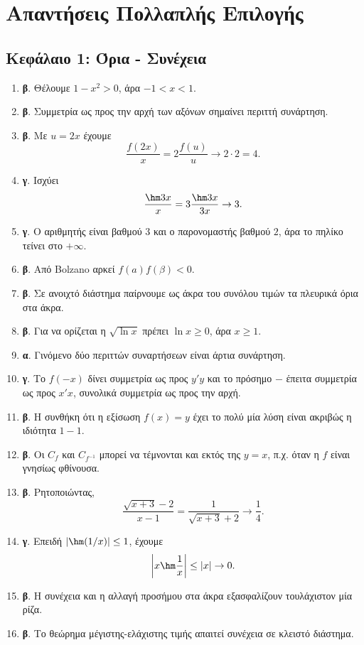 \section*{Απαντήσεις Πολλαπλής Επιλογής}

\subsection*{Κεφάλαιο 1: Όρια - Συνέχεια}
\begin{enumerate}[label=\textbf{1.\arabic*.}]
\item \textbf{β}. Θέλουμε $1-x^2>0$, άρα $-1<x<1$.
\item \textbf{β}. Συμμετρία ως προς την αρχή των αξόνων σημαίνει περιττή συνάρτηση.
\item \textbf{β}. Με $u=2x$ έχουμε
\[
\frac{f(2x)}{x}=2\frac{f(u)}{u}\to 2\cdot2=4.
\]
\item \textbf{γ}. Ισχύει
\[
\frac{\hm 3x}{x}=3\frac{\hm 3x}{3x}\to3.
\]
\item \textbf{γ}. Ο αριθμητής είναι βαθμού $3$ και ο παρονομαστής βαθμού $2$, άρα το πηλίκο τείνει στο $+\infty$.
\item \textbf{β}. Από Bolzano αρκεί $f(a)f(\beta)<0$.
\item \textbf{β}. Σε ανοιχτό διάστημα παίρνουμε ως άκρα του συνόλου τιμών τα πλευρικά όρια στα άκρα.
\item \textbf{β}. Για να ορίζεται η $\sqrt{\ln x}$ πρέπει $\ln x\geq0$, άρα $x\geq1$.
\item \textbf{α}. Γινόμενο δύο περιττών συναρτήσεων είναι άρτια συνάρτηση.
\item \textbf{γ}. Το $f(-x)$ δίνει συμμετρία ως προς $y'y$ και το πρόσημο $-$ έπειτα συμμετρία ως προς $x'x$, συνολικά συμμετρία ως προς την αρχή.
\item \textbf{β}. Η συνθήκη ότι η εξίσωση $f(x)=y$ έχει το πολύ μία λύση είναι ακριβώς η ιδιότητα $1-1$.
\item \textbf{β}. Οι $C_f$ και $C_{f^{-1}}$ μπορεί να τέμνονται και εκτός της $y=x$, π.χ. όταν η $f$ είναι γνησίως φθίνουσα.
\item \textbf{β}. Ρητοποιώντας,
\[
\frac{\sqrt{x+3}-2}{x-1}=\frac{1}{\sqrt{x+3}+2}\to\frac14.
\]
\item \textbf{γ}. Επειδή $|\hm(1/x)|\leq1$, έχουμε
\[
\left|x\hm\frac1x\right|\leq |x|\to0.
\]
\item \textbf{β}. Η συνέχεια και η αλλαγή προσήμου στα άκρα εξασφαλίζουν τουλάχιστον μία ρίζα.
\item \textbf{β}. Το θεώρημα μέγιστης-ελάχιστης τιμής απαιτεί συνέχεια σε κλειστό διάστημα.

\end{enumerate}
